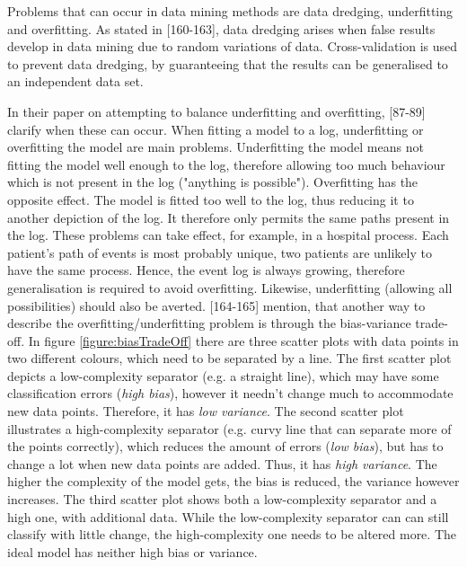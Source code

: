 Problems that can occur in data mining methods are data dredging, underfitting and overfitting. As stated in \textcite{DataMiningAndPredictiveAnalytics}[160-163], data dredging arises when false results develop in data mining due to random variations of data. Cross-validation is used to prevent data dredging, by guaranteeing that the results can be generalised to an independent data set. 

In their paper on attempting to balance underfitting and overfitting, \textcite{van2010process}[87-89] clarify when these can occur. When fitting a model to a log, underfitting or overfitting the model are main problems. Underfitting the model means not fitting the model well enough to the log, therefore allowing too much behaviour which is not present in the log ("anything is possible"). Overfitting has the opposite effect. The model is fitted too well to the log, thus reducing it to another depiction of the log. It therefore only permits the same paths present in the log. These problems can take effect, for example, in a hospital process. Each patient's path of events is most probably unique, two patients are unlikely to have the same process. Hence, the event log is always growing, therefore generalisation is required to avoid overfitting. Likewise, underfitting (allowing all possibilities) should also be averted. 
\textcite{DataMiningAndPredictiveAnalytics}[164-165] mention, that another way to describe the overfitting/underfitting problem is through the bias-variance trade-off. In figure \ref{figure:biasTradeOff} there are three scatter plots with data points in two different colours, which need to be separated by a line. The first scatter plot depicts a low-complexity separator (e.g. a straight line), which may have some classification errors (\textit{high bias}), however it needn't change much to accommodate new data points. Therefore, it has \textit{low variance}. The second scatter plot illustrates a high-complexity separator (e.g. curvy line that can separate more of the points correctly), which reduces the amount of errors (\textit{low bias}), but has to change a lot when new data points are added. Thus, it has \textit{high variance}. The higher the complexity of the model gets, the bias is reduced, the variance however increases. The third scatter plot shows both a low-complexity separator and a high one, with additional data. While the low-complexity separator can can still classify with little change, the high-complexity one needs to be altered more. The ideal model has neither high bias or variance.

